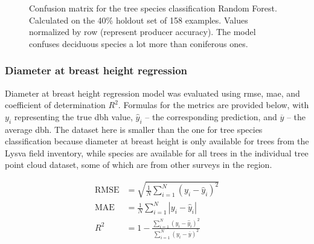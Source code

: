\begin{figure}
\caption[Confusion matrix for the tree species classification Random Forest.]{\label{fig-clf-confusion-matrix}Confusion matrix for the tree
species classification Random Forest. Calculated on the 40\% holdout set
    of 158 examples. Values normalized by row (represent producer accuracy). The model confuses deciduous
species a lot more than coniferous ones.}
\end{figure}

\subsubsection{Diameter at breast height regression}

Diameter at breast height regression model was evaluated using \acrfull{rmse}, \gls{mae}, and coefficient of determination $R^2$.
Formulas for the metrics are provided below, with $y_i$ representing the true \gls{dbh} value, $\hat y_i$ – the corresponding prediction, and $\overline y$ – the average \gls{dbh}.
The dataset here is smaller than the one for tree species classification because diameter at breast height is only available for trees from the Lysva field inventory, while species are available for all trees in the individual tree point cloud dataset, some of which are from other surveys in the region.

$$
\begin{aligned}
\text{RMSE} &= \sqrt{\frac{1}{N} \sum_{i=1}^N (y_i - \hat y_i)^2} \\
\text{MAE} &= \frac{1}{N} \sum_{i=1}^N | y_i - \hat y_i | \\
R^2 &= 1 - \frac{\sum_{i=1}^N (y_i - \hat y_i)^2}{\sum_{i=1}^N (y_i - \overline y)^2}
\end{aligned}
$$


